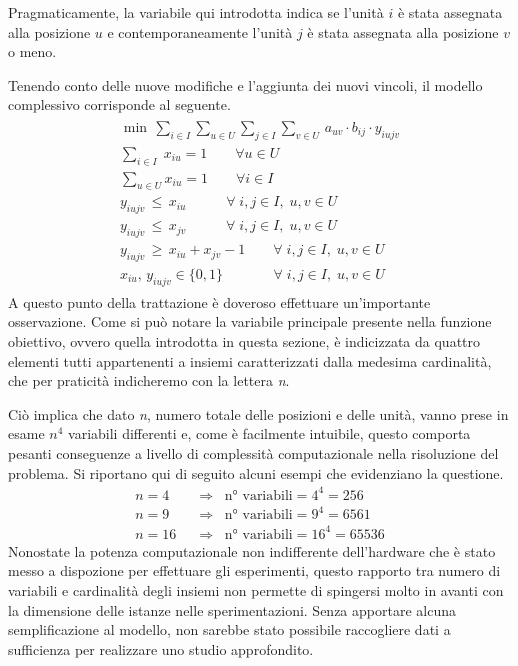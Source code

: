 Pragmaticamente, la variabile qui introdotta indica se l'unità $i$ è stata assegnata alla posizione $u$ e contemporaneamente 
l'unità $j$ è stata assegnata alla posizione $v$ o meno.

Tenendo conto delle nuove modifiche e l'aggiunta dei nuovi vincoli, il modello complessivo corrisponde al seguente.
\begin{align}
    \label{eq:mipqaplin}
	\begin{array}{l}
      \min \, \sum_{i\in I} \sum_{u\in U} \sum_{j\in I} \sum_{v\in U} \, a_{uv}\cdot b_{ij}\cdot y_{iujv} \\
      \sum_{i\in I} \; x_{iu} = 1  \qquad \forall u \in U \\
      \sum_{u\in U} x_{iu} = 1     \qquad \forall i \in I \\
      y_{iujv} \, \leq \, x_{iu}   \;\;\;\qquad \forall \; i,j \in I ,\; u,v \in U \\ 
      y_{iujv} \, \leq \, x_{jv}   \;\;\;\qquad \forall \; i,j \in I ,\; u,v \in U \\
      y_{iujv} \, \geq \, x_{iu} + x_{jv} - 1      \qquad \forall \; i,j \in I ,\; u,v \in U  \\
      x_{iu} ,\, y_{iujv} \in \{0,1\}   \;\,\,\quad\qquad \forall \; i,j \in I ,\; u,v \in U
    \end{array}
\end{align}
A questo punto della trattazione è doveroso effettuare un'importante osservazione. Come si può notare la variabile principale 
presente nella funzione obiettivo, ovvero quella introdotta in questa sezione, è indicizzata da quattro elementi tutti appartenenti 
a insiemi caratterizzati dalla medesima cardinalità, che per praticità indicheremo con la lettera \textit{n}. 

Ciò implica che dato \textit{n}, numero totale delle posizioni e delle unità, vanno prese in esame $n^4$ variabili differenti 
e, come è facilmente intuibile, questo comporta pesanti conseguenze a livello di complessità computazionale nella risoluzione 
del problema. Si riportano qui di seguito alcuni esempi che evidenziano la questione.
\begin{align*}
    n=4  \;\;&\Rightarrow\;\; \mbox{n° variabili} = 4^4 = 256 \\
    n=9  \;\;&\Rightarrow\;\; \mbox{n° variabili} = 9^4 = 6561 \\
    n=16 \;\;&\Rightarrow\;\; \mbox{n° variabili} = 16^4 = 65536
\end{align*}
Nonostate la potenza computazionale non indifferente dell'hardware che è stato messo a dispozione per effettuare gli esperimenti, 
questo rapporto tra numero di variabili e cardinalità degli insiemi non permette di spingersi molto in avanti con la dimensione delle 
istanze nelle sperimentazioni. Senza apportare alcuna semplificazione al modello, non sarebbe stato possibile raccogliere dati a 
sufficienza per realizzare uno studio approfondito.

